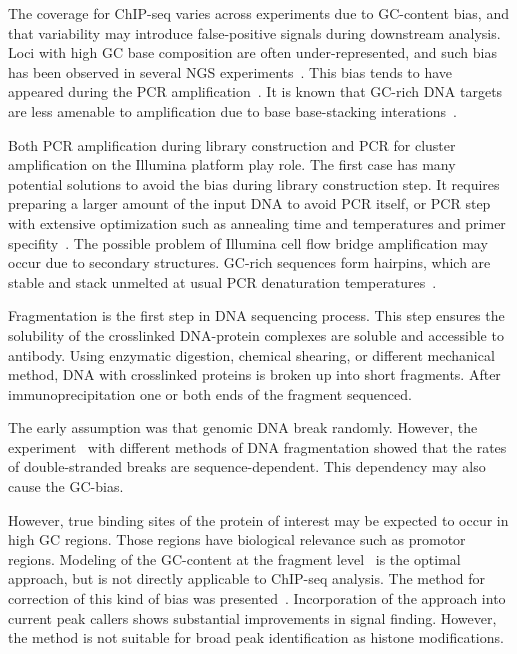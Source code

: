 
The coverage for ChIP-seq varies across experiments due to GC-content bias, and that variability may introduce false-positive signals during downstream analysis.
Loci with high GC base composition are often under-represented, and such bias has been observed in several NGS experiments~\cite{benjamini2012summarizing,dohm2008substantial,teng2017accounting}.
This bias tends to have appeared during the PCR amplification~\cite{ross2013characterizing}.
It is known that GC-rich DNA targets are less amenable to amplification due to base base-stacking interations~\cite{yakovchuk2006base}.

Both PCR amplification during library construction and PCR for cluster amplification on the Illumina platform play role. 
The first case has many potential solutions to avoid the bias during library construction step.
It requires preparing a larger amount of the input DNA to avoid PCR itself, or PCR step with extensive optimization such as annealing time and temperatures and primer specifity~\cite{aird2011analyzing}.
The possible problem of Illumina cell flow bridge amplification may occur due to secondary structures.
GC-rich sequences form hairpins, which are stable and stack unmelted at usual PCR denaturation temperatures~\cite{stein2010nucleosome}.

Fragmentation is the first step in DNA sequencing process.
This step ensures the solubility of the crosslinked DNA-protein complexes are soluble and accessible to antibody.
Using enzymatic digestion, chemical shearing, or different mechanical method, DNA with crosslinked proteins is broken up into short fragments.
After immunoprecipitation one or both ends of the fragment sequenced.


The early assumption was that genomic DNA break randomly.
However, the experiment~\cite{poptsova2014non} with different methods of DNA fragmentation showed that the rates of double-stranded breaks are sequence-dependent.
This dependency may also cause the GC-bias. 

However, true binding sites of the protein of interest may be expected to occur in high GC regions.
Those regions have biological relevance such as promotor regions.
Modeling of the GC-content at the fragment level~\cite{benjamini2012summarizing} is the optimal approach, but is not directly applicable to ChIP-seq analysis.
The method for correction of this kind of bias was presented~\cite{teng2017accounting}.
Incorporation of the approach into current peak callers shows substantial improvements in signal finding.
However, the method is not suitable for broad peak identification as histone modifications.






